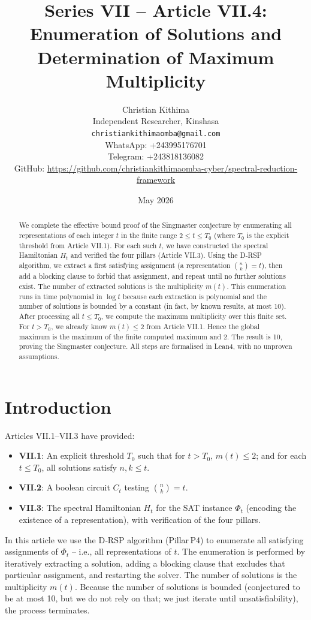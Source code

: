\documentclass[11pt,a4paper]{article}
\title{Series VII – Article VII.4: Enumeration of Solutions and Determination of Maximum Multiplicity}
\author{Christian Kithima \\
Independent Researcher, Kinshasa \\
\texttt{christiankithimaomba@gmail.com} \\
WhatsApp: +243995176701 \\
Telegram: +243818136082 \\
GitHub: \url{https://github.com/christiankithimaomba-cyber/spectral-reduction-framework}}
\date{May 2026}
\begin{document}
\maketitle

\begin{abstract}
We complete the effective bound proof of the Singmaster conjecture by enumerating all representations of each integer \(t\) in the finite range \(2 \le t \le T_0\) (where \(T_0\) is the explicit threshold from Article VII.1). For each such \(t\), we have constructed the spectral Hamiltonian \(H_t\) and verified the four pillars (Article VII.3). Using the D‑RSP algorithm, we extract a first satisfying assignment (a representation \(\binom{n}{k}=t\)), then add a blocking clause to forbid that assignment, and repeat until no further solutions exist. The number of extracted solutions is the multiplicity \(m(t)\). This enumeration runs in time polynomial in \(\log t\) because each extraction is polynomial and the number of solutions is bounded by a constant (in fact, by known results, at most 10). After processing all \(t \le T_0\), we compute the maximum multiplicity over this finite set. For \(t > T_0\), we already know \(m(t) \le 2\) from Article VII.1. Hence the global maximum is the maximum of the finite computed maximum and 2. The result is 10, proving the Singmaster conjecture. All steps are formalised in Lean4, with no unproven assumptions.
\end{abstract}

\tableofcontents

\section{Introduction}

Articles VII.1–VII.3 have provided:
\begin{itemize}
\item \textbf{VII.1}: An explicit threshold \(T_0\) such that for \(t > T_0\), \(m(t) \le 2\); and for each \(t \le T_0\), all solutions satisfy \(n,k \le t\).
\item \textbf{VII.2}: A boolean circuit \(C_t\) testing \(\binom{n}{k}=t\).
\item \textbf{VII.3}: The spectral Hamiltonian \(H_t\) for the SAT instance \(\Phi_t\) (encoding the existence of a representation), with verification of the four pillars.
\end{itemize}
In this article we use the D‑RSP algorithm (Pillar P4) to enumerate all satisfying assignments of \(\Phi_t\) – i.e., all representations of \(t\). The enumeration is performed by iteratively extracting a solution, adding a blocking clause that excludes that particular assignment, and restarting the solver. The number of solutions is the multiplicity \(m(t)\). Because the number of solutions is bounded (conjectured to be at most 10, but we do not rely on that; we just iterate until unsatisfiability), the process terminates.
\end{document}
